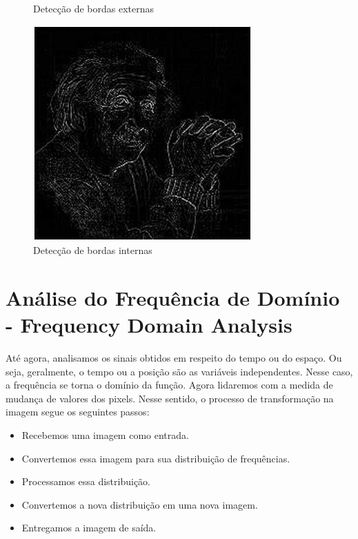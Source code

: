 \documentclass[a4paper, 12pt]{article}
\begin{document}
\begin{figure}[!htb]
		\caption{Detecção de bordas externas}
  	\endminipage\hspace{1cm}
	  	\includegraphics[width=\linewidth]{images/laplacian2.jpg}
	  	\caption{Detecção de bordas internas}
	\endminipage
\end{figure}
\section{Análise do Frequência de Domínio - Frequency Domain Analysis}
Até agora, analisamos os sinais obtidos em respeito do tempo ou do espaço. Ou seja, geralmente, o tempo ou a posição são as variáveis independentes. 
Nesse caso, a frequência se torna o domínio da função. Agora lidaremos com a medida de mudança de valores dos pixels. Nesse sentido, 
o processo de transformação na imagem segue os seguintes passos:
\begin{itemize}
	\item Recebemos uma imagem como entrada.
 	\item Convertemos essa imagem para sua distribuição de frequências.
  	\item Processamos essa distribuição.
   	\item Convertemos a nova distribuição em uma nova imagem.
    \item Entregamos a imagem de saída.
\end{itemize}
\end{document}
